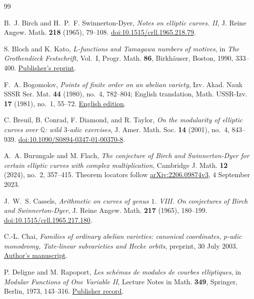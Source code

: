 \begin{thebibliography}{99}

B.~J. Birch and H.~P.~F. Swinnerton-Dyer,
\emph{Notes on elliptic curves. II},
J. Reine Angew. Math. \textbf{218} (1965), 79--108.
\href{https://doi.org/10.1515/crll.1965.218.79}{doi:10.1515/crll.1965.218.79}.

S. Bloch and K. Kato,
\emph{$L$-functions and Tamagawa numbers of motives},
in \emph{The Grothendieck Festschrift}, Vol.~I,
Progr. Math. \textbf{86}, Birkh\"auser, Boston, 1990, 333--400.
\href{https://doi.org/10.1007/978-0-8176-4574-8_9}{Publisher's reprint}.

F.~A. Bogomolov,
\emph{Points of finite order on an abelian variety},
Izv. Akad. Nauk SSSR Ser. Mat. \textbf{44} (1980), no.~4, 782--804;
English translation, Math. USSR-Izv. \textbf{17} (1981), no.~1, 55--72.
\href{https://doi.org/10.1070/IM1981v017n01ABEH001329}{English edition}.

C. Breuil, B. Conrad, F. Diamond, and R. Taylor,
\emph{On the modularity of elliptic curves over $\mathbb Q$:
wild $3$-adic exercises},
J. Amer. Math. Soc. \textbf{14} (2001), no.~4, 843--939.
\href{https://doi.org/10.1090/S0894-0347-01-00370-8}{doi:10.1090/S0894-0347-01-00370-8}.

A.~A. Burungale and M. Flach,
\emph{The conjecture of Birch and Swinnerton-Dyer for certain
elliptic curves with complex multiplication},
Cambridge J. Math. \textbf{12} (2024), no.~2, 357--415.
Theorem locators follow
\href{https://arxiv.org/abs/2206.09874v3}{arXiv:2206.09874v3},
4 September 2023.

J.~W.~S. Cassels,
\emph{Arithmetic on curves of genus $1$. VIII.
On conjectures of Birch and Swinnerton-Dyer},
J. Reine Angew. Math. \textbf{217} (1965), 180--199.
\href{https://doi.org/10.1515/crll.1965.217.180}{doi:10.1515/crll.1965.217.180}.

C.-L. Chai,
\emph{Families of ordinary abelian varieties: canonical coordinates,
$p$-adic monodromy, Tate-linear subvarieties and Hecke orbits},
preprint, 30 July 2003.
\href{https://www2.math.upenn.edu/~chai/papers_pdf/fam_ord_av.pdf}{Author's manuscript}.

P. Deligne and M. Rapoport,
\emph{Les sch\'emas de modules de courbes elliptiques},
in \emph{Modular Functions of One Variable II},
Lecture Notes in Math. \textbf{349}, Springer, Berlin, 1973, 143--316.
\href{https://doi.org/10.1007/978-3-540-37855-6_4}{Publisher record}.


\end{thebibliography}
